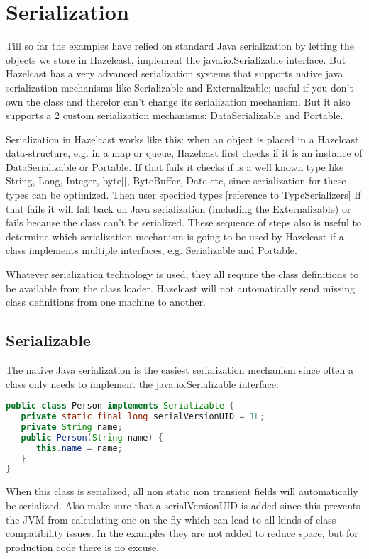 \chapter{Serialization}
Till so far the examples have relied on standard Java serialization by letting the objects we store in Hazelcast, implement the java.io.Serializable interface. But Hazelcast has a very advanced serialization systems that supports native java serialization mechanisms like Serializable and Externalizable;  useful if you don't own the class and therefor can't change its serialization mechanism. But it also supports a 2 custom serialization mechanisms: DataSerializable and Portable.

Serialization in Hazelcast works like this: when an object is placed in a Hazelcast data-structure, e.g. in a map or queue, Hazelcast first checks if it is an instance of DataSerializable or Portable. If that fails it checks if is a well known type like String, Long, Integer, byte[], ByteBuffer, Date etc, since serialization for these types can be optimized. Then user specified types [reference to TypeSerializers] If that fails it will fall back on Java serialization (including the Externalizable) or fails because the class can't be serialized. These sequence of steps also is useful to determine which serialization mechanism is going to be used by Hazelcast if a class implements multiple interfaces, e.g. Serializable and Portable.

Whatever serialization technology is used, they all require the class definitions to be available from the class loader. Hazelcast will not automatically send missing class definitions from one machine to another. 

\section{Serializable}
The native Java serialization is the easiest serialization mechanism since often a class only needs to implement the java.io.Serializable interface:
\begin{lstlisting}[language=java]
public class Person implements Serializable {
   private static final long serialVersionUID = 1L;
   private String name;
   public Person(String name) {
      this.name = name; 
   }
}
\end{lstlisting}
When this class is serialized, all non static non transient fields will automatically be serialized. Also make sure that a serialVersionUID is added since this prevents the JVM from calculating one on the fly which can lead to all kinds of class compatibility issues. In the examples they are not added to reduce space, but for production code there is no excuse.


